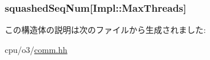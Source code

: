 \label{structDefaultIEWDefaultCommit_a1ecc4947f538d6f0777049675b1d4dbc}
\hypertarget{structDefaultIEWDefaultCommit_a97d5a7e4630ad1d017909f7504b9ec32}{
\subsubsection[{squashedSeqNum}]{ {\bf squashedSeqNum}\mbox{[}Impl::MaxThreads\mbox{]}}}
\label{structDefaultIEWDefaultCommit_a97d5a7e4630ad1d017909f7504b9ec32}


この構造体の説明は次のファイルから生成されました:\begin{DoxyCompactItemize}
\item 
cpu/o3/\hyperlink{o3_2comm_8hh}{comm.hh}\end{DoxyCompactItemize}

